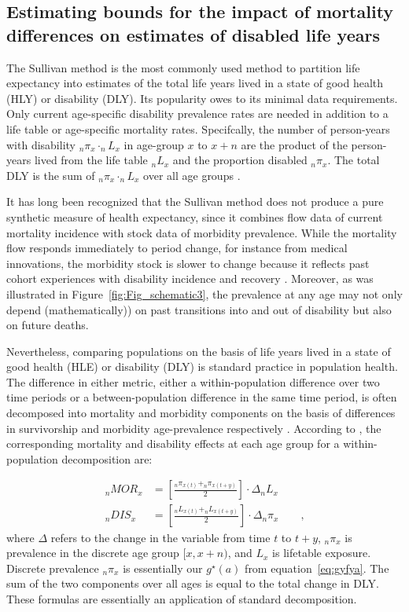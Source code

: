\documentclass[11pt,oneside,a4paper]{article} %
\newcommand{\tc}{\quad\quad\text{,}}
\begin{document}
\FloatBarrier
\subsection{Estimating bounds for the impact of mortality differences on estimates of disabled life years}
\label{sec:bounds}
The Sullivan method is the most commonly used method to partition life
expectancy into estimates of the total life years lived in a state of good
health (HLY) or disability (DLY). Its popularity owes to its minimal data
requirements. Only current age-specific disability prevalence rates are needed
in addition to a life table or age-specific mortality rates. Specifcally, the
number of person-years with disability $_{n}\pi _{x} \cdot _{n}L _{x}$ in
age-group $x$ to $x+n$ are the product of the person-years lived from the life
table $_{n}L _{x}$ and the proportion disabled $_{n}\pi _{x}$. The total DLY is
the sum of  $_{n}\pi _{x} \cdot _{n}L _{x}$ over all age groups
\citep{Sullivan1970}.

It has long been recognized that the Sullivan method does not produce a pure
synthetic measure of health expectancy, since it combines flow data of current
mortality incidence with stock data of morbidity prevalence. While the mortality
flow responds immediately to period change, for instance from medical
innovations, the morbidity stock is slower to change because it reflects past
cohort experiences with disability incidence and recovery
\citep{Mathers1997,Barendregt1994}. Moreover, as was illustrated in
Figure~\ref{fig:Fig_schematic3}, the prevalence at any age may not only depend
(mathematically)) on past transitions into and out of disability but also on
future deaths.

Nevertheless, comparing populations on the basis of life years lived in a state
of good health (HLE) or disability (DLY) is standard practice in population
health. The difference in either metric, either a within-population difference
over two time periods or a between-population difference in the same time
period, is often decomposed into mortality and morbidity components on the basis
of differences in survivorship and morbidity age-prevalence respectively
\citep{Nusselder2004,Andreev2002}. According to \citet{Nusselder2004}, the corresponding mortality and disability effects at each age group for a within-population decomposition are:

\begin{align}
	{_{n}{MOR}_{x}}&=\left [ \frac{_{n}\pi_{x\left ( t \right )} + _{n}\pi_{x\left
	( t+y \right )}  }{2}\right ]\cdot \Delta _{n}L_{x} \label{eq:MORcomp}\\
	{_{n}{DIS}_{x}}&=\left [ \frac{_{n}L_{x\left ( t \right )} + _{n}L_{x\left (
	t+y \right )}  }{2}\right ]\cdot \Delta _{n}\pi_{x}	\tc \label{eq:DIScomp}
\end{align}
where $\Delta$ refers to the change in the variable from time $t$ to $t+y$,
$_{n}\pi_x$ is prevalence in the discrete age group $[x,x+n)$, and $L_x$ is
lifetable exposure. Discrete prevalence $_{n}\pi_x$ is essentially our
$g^\star(a)$ from equation~\eqref{eq:gyfya}. The sum of the two components over
all ages is equal to the total change in DLY. These formulas are essentially an
application of standard \citet{kitagawa1955components} decomposition.
\end{document}
